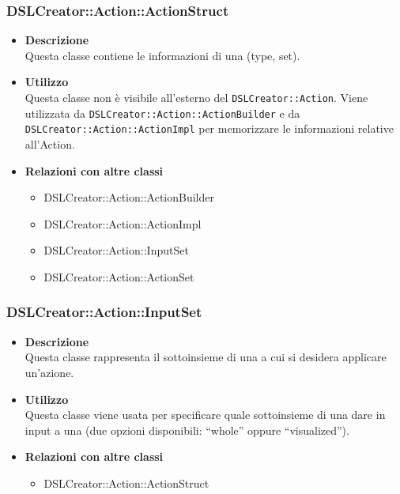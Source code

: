  \subsubsection{DSLCreator::Action::ActionStruct}
                    \begin{itemize}
                        \item \textbf{Descrizione} \hfill \\
                          Questa classe contiene le informazioni di una  (type, set).
                        \item \textbf{Utilizzo} \hfill \\
                          Questa classe non è visibile all'esterno del  \texttt{DSLCreator::Action}. Viene utilizzata da \texttt{DSLCreator::Action::ActionBuilder} e da \texttt{DSLCrea\-tor::Action::ActionImpl} per memorizzare le informazioni relative all'Action.
                        \item \textbf{Relazioni con altre classi}
                            \begin{itemize}
                              \item DSLCreator::Action::ActionBuilder
                              \item DSLCreator::Action::ActionImpl
                              \item DSLCreator::Action::InputSet
                              \item DSLCreator::Action::ActionSet
                            \end{itemize}
                    \end{itemize}  

 \subsubsection{DSLCreator::Action::InputSet}
                    \begin{itemize}
                        \item \textbf{Descrizione} \hfill \\
                          Questa classe rappresenta il sottoinsieme di una  a cui si desidera applicare un'azione.
                        \item \textbf{Utilizzo} \hfill \\
                          Questa classe viene usata per specificare quale sottoinsieme di una  dare in input a una  (due opzioni disponibili: ``whole'' oppure ``visualized'').
                        \item \textbf{Relazioni con altre classi}
                            \begin{itemize}
                              \item DSLCreator::Action::ActionStruct
                            \end{itemize}
                    \end{itemize}  


